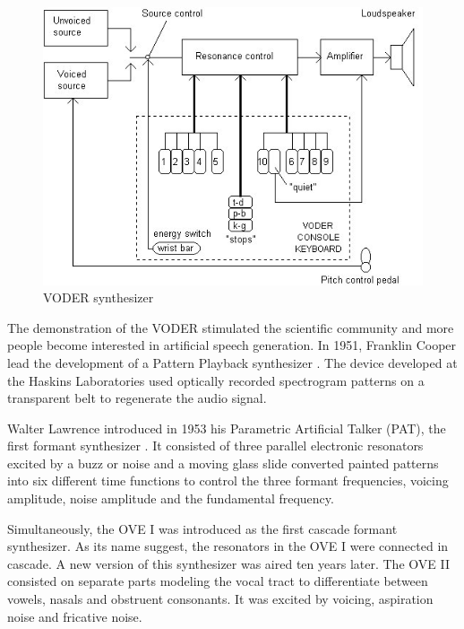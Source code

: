 \begin{figure}[htb]
	\begin{center}
		\includegraphics[width=\textwidth]{images/voder.jpg}
		\caption{VODER synthesizer \cite{Klatt87}}
		\label{fig:voder}
	\end{center}
\end{figure}

The demonstration of the VODER stimulated the scientific community and more people become interested in artificial speech generation. In 1951, Franklin Cooper lead the development of a Pattern Playback synthesizer \cite{Klatt87, flanagan_1973_speech}. The device developed at the Haskins Laboratories used optically recorded spectrogram patterns on a transparent belt to regenerate the audio signal. 

Walter Lawrence introduced in 1953 his Parametric Artificial Talker (PAT), the first formant synthesizer \cite{Klatt87}. It consisted of three parallel electronic resonators excited by a buzz or noise and a moving glass slide converted painted patterns into six different time functions to control the three formant frequencies, voicing amplitude, noise amplitude and the fundamental frequency. 

Simultaneously, the OVE I was introduced as the first cascade formant synthesizer. As its name suggest, the resonators in the OVE I were connected in cascade. A new version of this synthesizer was aired ten years later. The OVE II consisted on separate parts modeling the vocal tract to differentiate between vowels, nasals and obstruent consonants. It was excited by voicing, aspiration noise and fricative noise.


